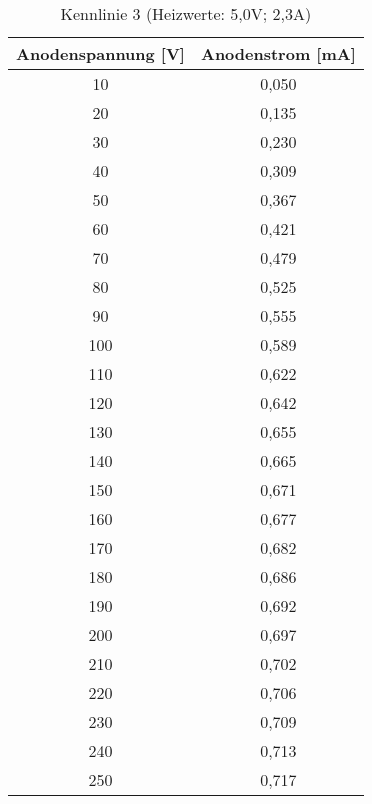 \begin{table}[h]
	\begin{center}
		\begin{tabular}{cc}
			Anodenspannung [V] & Anodenstrom [mA]\\ \hline
			10	&0,050\\
			20	&0,135\\
			30	&0,230\\
			40	&0,309\\
			50	&0,367\\
			60	&0,421\\
			70	&0,479\\
			80	&0,525\\
			90	&0,555\\
			100	&0,589\\
			110	&0,622\\
			120	&0,642\\
			130	&0,655\\
			140	&0,665\\
			150	&0,671\\
			160	&0,677\\
			170	&0,682\\
			180	&0,686\\
			190	&0,692\\
			200	&0,697\\
			210	&0,702\\
			220	&0,706\\
			230	&0,709\\
			240	&0,713\\
			250	&0,717
		\end{tabular}
		\caption{Kennlinie 3 (Heizwerte: 5,0V; 2,3A)}
		\label{taba3}
	\end{center}
\end{table}